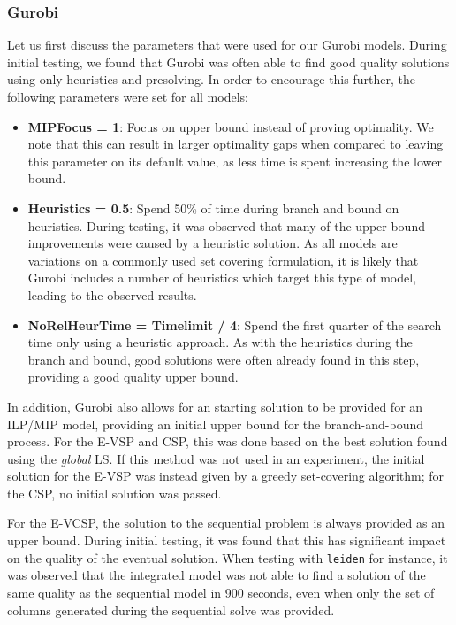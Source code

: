 \documentclass[]{article}
\begin{document}
\subsubsection{Gurobi}
Let us first discuss the parameters that were used for our Gurobi models. During initial testing, we found that Gurobi was often able to find good quality solutions using only heuristics and presolving. In order to encourage this further, the following parameters were set for all models: 
\begin{itemize}
  \item \textbf{MIPFocus = 1}: Focus on upper bound instead of proving optimality. We note that this can result in larger optimality gaps when compared to leaving this parameter on its default value, as less time is spent increasing the lower bound.
  \item \textbf{Heuristics = 0.5}: Spend 50\% of time during branch and bound on heuristics. During testing, it was observed that many of the upper bound improvements were caused by a heuristic solution. As all models are variations on a commonly used set covering formulation, it is likely that Gurobi includes a number of heuristics which target this type of model, leading to the observed results. 
  \item \textbf{NoRelHeurTime = Timelimit / 4}: Spend the first quarter of the search time only using a heuristic approach. As with the heuristics during the branch and bound, good solutions were often already found in this step, providing a good quality upper bound.
\end{itemize} 

\noindent In addition, Gurobi also allows for an starting solution to be provided for an ILP/MIP model, providing an initial upper bound for the branch-and-bound process. For the E-VSP and CSP, this was done based on the best solution found using the \emph{global} LS. If this method was not used in an experiment, the initial solution for the E-VSP was instead given by a greedy set-covering algorithm; for the CSP, no initial solution was passed. 

For the E-VCSP, the solution to the sequential problem is always provided as an upper bound. During initial testing, it was found that this has significant impact on the quality of the eventual solution. When testing with \texttt{leiden} for instance, it was observed that the integrated model was not able to find a solution of the same quality as the sequential model in 900 seconds, even when only the set of columns generated during the sequential solve was provided.
\end{document}
